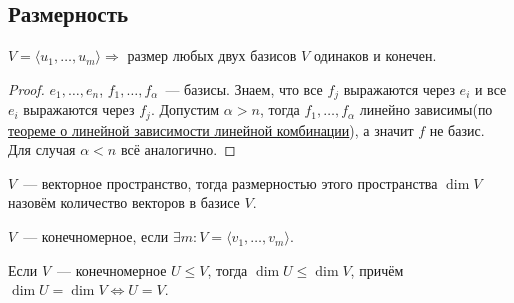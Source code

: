 \subsection{Размерность}
\begin{theorem}
    $V = \langle u_1,\dots,u_m\rangle \Rightarrow$ размер любых двух базисов $V$ одинаков и конечен.
\end{theorem}
\begin{proof}
    $e_1,\dots,e_n$, $f_1,\dots,f_\alpha$~--- базисы. Знаем, что все $f_j$
    выражаются через $e_i$ и все $e_i$ выражаются через $f_j$.
    Допустим $\alpha > n$, тогда $f_1,\dots,f_\alpha$ линейно зависимы(по \hyperref[thm:О линейной зависимости линейной комбинации]
    {теореме о линейной зависимости линейной комбинации}), а значит $f$ не базис.
    Для случая $\alpha < n$ всё аналогично.
\end{proof}
\begin{definition}
    $V$~--- векторное пространство, тогда размерностью этого пространства $\dim V$ назовём
     количество векторов в базисе $V$.
\end{definition}
\begin{definition}
    $V$~--- конечномерное, если $\exists m\colon V = \langle v_1,\dots, v_m\rangle$.
\end{definition}
\begin{lemma}
    Если $V$~--- конечномерное $U \leq V$, тогда $\dim U \leq \dim V$, причём $\dim U = \dim V \Leftrightarrow U=V$.
\end{lemma}
